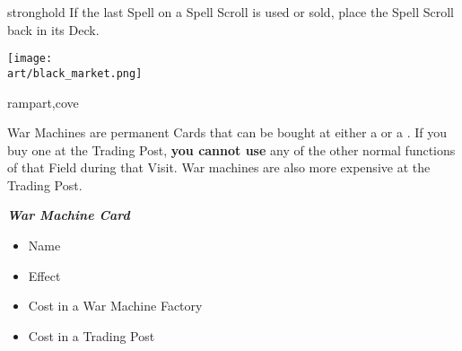 \begin{multicols*}{2}
\begin{expansion}{stronghold}
If the last Spell on a Spell Scroll is used or sold, place the Spell Scroll back in its Deck.
\end{expansion}

\begin{center}
  {\texttt{[image: \\art/black\_market.png]}}
\end{center}

\begin{expansion}{rampart,cove}

  War Machines are permanent Cards that can be bought at either a  or a .
  If you buy one at the Trading Post, \textbf{you cannot use} any of the other normal functions of that Field during that Visit.
  War machines are also more expensive at the Trading Post.

  {
    \bigskip
    \centering
    \begin{scriptsize}
    \end{scriptsize}

    \footnotesize
    \textbf{\textit{\textcolor{darkcandyapplered}{War Machine Card}}}
    \begin{itemize}[itemsep=0pt, parsep=5pt, topsep=0pt, partopsep=0pt]
      \item[\textbf{1.}] Name
      \item[\textbf{2.}] Effect
      \item[\textbf{3.}] Cost in a War Machine Factory
      \item[\textbf{4.}] Cost in a Trading Post
    \end{itemize}
  }
\end{expansion}

\vspace*{\fill}
\end{multicols*}

